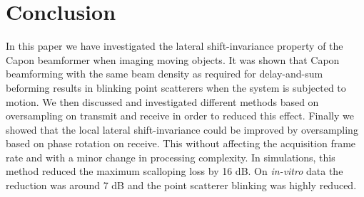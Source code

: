 \documentclass[draftcls]{IEEEtran}
\begin{document}

\section{Conclusion}\label{sec:con}

In this paper we have investigated the lateral shift-invariance property of the Capon beamformer when imaging moving objects. It was shown that Capon beamforming with the same beam density as required for delay-and-sum beforming results in blinking point scatterers when the system is subjected to motion.  We then discussed and investigated different methods based on oversampling on transmit and receive in order to reduced this effect. Finally we showed that the local lateral shift-invariance could be improved by oversampling based on phase rotation on receive. This without affecting the acquisition frame rate and with a minor change in processing complexity. In simulations, this method reduced the maximum scalloping loss by 16 dB. On \textit{in-vitro} data the reduction was around 7 dB and the point scatterer blinking was highly reduced. 
\end{document}
